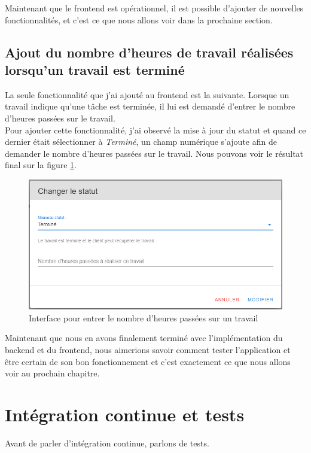 \documentclass[
    iai, %
    il, %
]{heig-tb}
\begin{document}
Maintenant que le \Gls{frontend} est opérationnel, il est possible d'ajouter de nouvelles fonctionnalités, et c'est ce que nous allons voir dans la prochaine section.

\section{Ajout du nombre d'heures de travail réalisées lorsqu'un travail est terminé}
La seule fonctionnalité que j'ai ajouté au \Gls{frontend} est la suivante. Lorsque un travail indique qu'une tâche est terminée, il lui est demandé d'entrer le nombre d'heures passées sur le travail. \\
Pour ajouter cette fonctionnalité, j'ai observé la mise à jour du statut et quand ce dernier était sélectionner à \emph{Terminé}, un champ numérique s'ajoute afin de demander le nombre d'heures passées sur le travail. Nous pouvons voir le résultat final sur la figure \ref{nb-worked-hours}.

\begin{center}
    \begin{figure}
        \includegraphics[width=\textwidth]{./assets/figures/nb-worked-hours.png}
        \caption{Interface pour entrer le nombre d'heures passées sur un travail \label{nb-worked-hours}}
    \end{figure}
\end{center}

Maintenant que nous en avons finalement terminé avec l'implémentation du \Gls{backend} et du \Gls{frontend}, nous aimerions savoir comment tester l'application et être certain de son bon fonctionnement et c'est exactement ce que nous allons voir au prochain chapitre.

\chapter{Intégration continue et tests}
Avant de parler d'intégration continue, parlons de tests.
\end{document}
